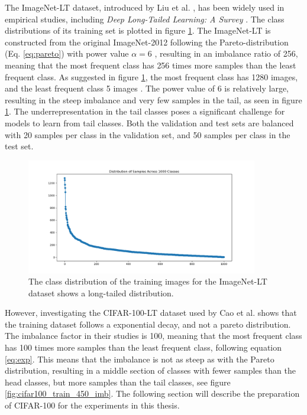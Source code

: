 The ImageNet-LT dataset, introduced by Liu et al. \cite{liu2019largescalelongtailedrecognitionopen}, has been widely used in empirical studies, including \textit{Deep Long-Tailed Learning: A Survey} \cite{zhang2023deep}. The class distributions of its training set is plotted in figure \ref{fig:IN-train}. The ImageNet-LT is constructed from the original ImageNet-2012 following the Pareto-distribution (Eq. \eqref{eq:pareto}) with power value $\alpha=6$ \cite{liu2019largescalelongtailedrecognitionopen}, resulting in an imbalance ratio of 256, meaning that the most frequent class has 256 times more samples than the least frequent class. As suggested in figure \ref{fig:IN-train}, the most frequent class has 1280 images, and the least frequent class 5 images \cite{liu2019largescalelongtailedrecognitionopen}. The power value of 6 is relatively large, resulting in the steep imbalance and very few samples in the tail, as seen in figure \ref{fig:IN-train}. The underrepresentation in the tail classes poses a significant challenge for models to learn from tail classes. Both the validation and test sets are balanced with 20 samples per class in the validation set, and 50 samples per class in the test set. 


\begin{figure}[h!]
    \centering
    \includegraphics[width=0.9\textwidth]{Images/Plots/class_distribution_train.png}
    \caption{The class distribution of the training images for the ImageNet-LT dataset shows a long-tailed distribution.}
    \label{fig:IN-train}
\end{figure}


However, investigating the CIFAR-100-LT dataset used by Cao et al. \cite{cao2019learningimbalanceddatasetslabeldistributionaware} shows that the training dataset follows a exponential decay, and not a pareto distribution. The imbalance factor in their studies is 100, meaning that the most frequent class has 100 times more samples than the least frequent class, following equation \eqref{eq:exp}. This means that the imbalance is not as steep as with the Pareto distribution, resulting in a middle section of classes with fewer samples than the head classes, but more samples than the tail classes, see figure \ref{fig:cifar100_train_450_imb}. The following section will describe the preparation of CIFAR-100 for the experiments in this thesis.


